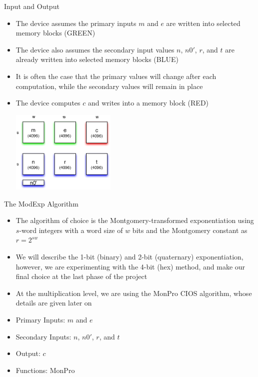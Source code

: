 \documentclass[xcolor=dvipsnames]{beamer}
\begin{document}
\begin{frame}{Input and Output}
\begin{itemize}

\item The device assumes the primary inputs $m$ and $e$ are
written into selected memory blocks (GREEN)
\item The device also assumes the secondary input values $n$, $n0'$,
$r$, and $t$ are already written into selected memory blocks (BLUE)
\item It is often the case that the primary values will change after
each computation, while the secondary values will remain in place
\item The device computes $c$ and writes into a memory block (RED)

\centerline{\includegraphics[width=5cm]{io.eps}}
  
\end{itemize}
\end{frame}

\begin{frame}{The ModExp Algorithm}
\begin{itemize}

\item The algorithm of choice is the Montgomery-transformed 
exponentiation using $s$-word integers with a word size of $w$ bits
and the Montgomery constant as $r=2^{sw}$

\item We will describe the 1-bit (binary) and 2-bit (quaternary) 
exponentiation, however, we are experimenting with the 4-bit (hex)
method, and make our final choice at the last phase of the project

\item At the multiplication level, we are using the MonPro CIOS algorithm,
whose details are given later on

\item Primary Inputs: $m$ and $e$
\item Secondary Inputs: $n$, $n0'$, $r$, and $t$
\item Output: $c$
\item Functions: MonPro

\end{itemize}
\end{frame}
\end{document}
